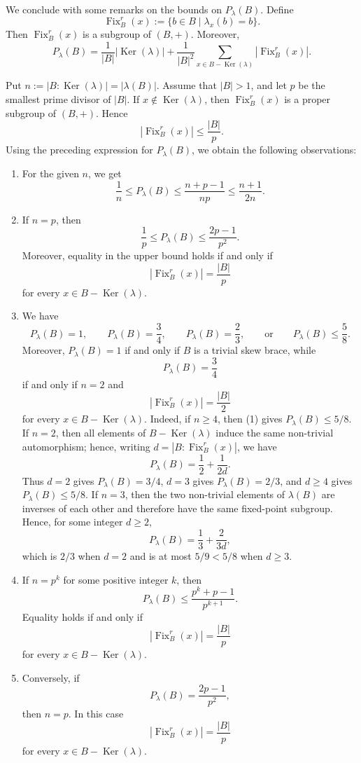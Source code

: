 \documentclass[10pt,a4paper]{amsart}
\numberwithin{equation}{section}
\newcommand{\Ker}{\operatorname{Ker} }
\newcommand{\Fix}{\operatorname{Fix} }
\begin{document}
We conclude with some remarks on the bounds on $P_{\lambda}(B)$. Define
$$
\Fix^r_B(x):=\{b\in B\mid \lambda_x(b)=b\}.
$$
Then $\Fix^r_B(x)$ is a subgroup of $(B,+)$. Moreover,
$$
P_{\lambda}(B)
=
\frac{1}{|B|}|\Ker(\lambda)|
+
\frac{1}{|B|^2}
\sum_{x\in B-\Ker(\lambda)}|\Fix^r_B(x)|.
$$

Put
$n:=|B:\Ker(\lambda)|=|\lambda(B)|$. Assume that $|B|>1$, and let $p$ be the smallest prime divisor of $|B|$.
If $x\notin\Ker(\lambda)$, then $\Fix^r_B(x)$ is a proper subgroup of
$(B,+)$. Hence
$$
|\Fix^r_B(x)|\leqslant\frac{|B|}{p}.
$$
Using the preceding expression for $P_{\lambda}(B)$, we obtain the
following observations:
\begin{enumerate}
    \item For the given $n$, we get
    $$
    \frac{1}{n}
    \leqslant
    P_{\lambda}(B)
    \leqslant
    \frac{n+p-1}{np}
    \leqslant
    \frac{n+1}{2n}.
    $$

    \item
    If $n=p$, then
    $$
    \frac{1}{p}
    \leqslant
    P_{\lambda}(B)
    \leqslant
    \frac{2p-1}{p^2}.
    $$
    Moreover, equality in the upper bound holds if and only if
    $$
    |\Fix^r_B(x)|=\frac{|B|}{p}
    $$
    for every $x\in B-\Ker(\lambda)$.

\item
    We have
    $$
    P_{\lambda}(B)=1,\qquad
    P_{\lambda}(B)=\frac{3}{4},\qquad
    P_{\lambda}(B)=\frac{2}{3},
    \qquad\text{or}\qquad
    P_{\lambda}(B)\leqslant\frac{5}{8}.
    $$
    Moreover, $P_{\lambda}(B)=1$ if and only if $B$ is a trivial skew brace,
    while
    $$
    P_{\lambda}(B)=\frac{3}{4}
    $$
    if and only if $n=2$ and
    $$
    |\Fix^r_B(x)|=\frac{|B|}{2}
    $$
    for every $x\in B-\Ker(\lambda)$. Indeed, if $n\geqslant4$, then (1) gives
    $P_{\lambda}(B)\leqslant5/8$. If $n=2$, then all elements of
    $B-\Ker(\lambda)$ induce the same non-trivial automorphism; hence, writing
    $d=|B:\Fix^r_B(x)|$, we have
    $$
    P_{\lambda}(B)=\frac12+\frac{1}{2d}.
    $$
    Thus $d=2$ gives $P_{\lambda}(B) = 3/4$, $d=3$ gives $P_{\lambda}(B) = 2/3$, and $d\geqslant4$ gives
    $P_{\lambda}(B) \leqslant 5/8$. If $n=3$, then the two non-trivial elements of $\lambda(B)$ are inverses of each other
    and therefore have the same fixed-point subgroup. Hence, for some integer
    $d \geqslant 2$,
    $$
    P_{\lambda}(B)=\frac13+\frac{2}{3d},
    $$
    which is $2/3$ when $d=2$ and is at most $5/9<5/8$ when $d\geqslant3$.

    \item
    If $n=p^k$ for some positive integer $k$, then
    $$
    P_{\lambda}(B)
    \leqslant
    \frac{p^k+p-1}{p^{k+1}}.
    $$
    Equality holds if and only if
    $$
    |\Fix^r_B(x)|=\frac{|B|}{p}
    $$
    for every $x\in B-\Ker(\lambda)$.

    \item Conversely,    if
    $$
    P_{\lambda}(B)=\frac{2p-1}{p^2},
    $$
    then $n=p$. In this case
    $$
    |\Fix^r_B(x)|=\frac{|B|}{p}
    $$
    for every $x\in B-\Ker(\lambda)$.
\end{enumerate}
\end{document}
